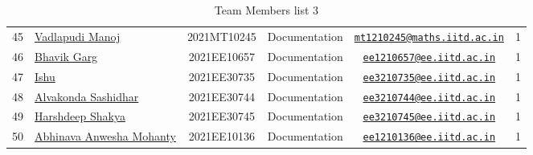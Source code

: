 \documentclass[table]{rapportCS}
\begin{document}
\begin{table}\label{sec:ourtribethree}
  \caption{Team Members list 3}
  \label{tab:team-members}
  
  \begin{tabular}{|p{.3cm}|p{3cm}|c|p{2.7cm}|c|c|}
  \hline
45 & \href{https://www.linkedin.com/in/vadlapudi-manoj-5a764825a/}{Vadlapudi Manoj} &
2021MT10245 & Documentation  &
\href{mailto:mt1210245@maths.iitd.ac.in}{\nolinkurl{mt1210245@maths.iitd.ac.in}}
& 1 \\
46 & \href{https://www.linkedin.com/in/bhavik-garg-4b214422a}{Bhavik
Garg} & 2021EE10657 & Documentation  &
\href{mailto:ee1210657@ee.iitd.ac.in}{\nolinkurl{ee1210657@ee.iitd.ac.in}}
& 1 \\
47 & \href{https://www.linkedin.com/in/ishu-ishu-9241242ab/}{Ishu} &
2021EE30735 & Documentation  &
\href{mailto:ee3210735@ee.iitd.ac.in}{\nolinkurl{ee3210735@ee.iitd.ac.in}}
& 1 \\
48 &
\href{https://www.linkedin.com/in/sashidhar-alvakonda-32b9011a5}{Alvakonda
Sashidhar} & 2021EE30744 & Documentation  &
\href{mailto:ee3210744@ee.iitd.ac.in}{\nolinkurl{ee3210744@ee.iitd.ac.in}}
& 1 \\
49 &
\href{https://www.linkedin.com/in/harshdeep-shakya-507304236/}{Harshdeep
Shakya} & 2021EE30745 & Documentation  &
\href{mailto:ee3210745@ee.iitd.ac.in}{\nolinkurl{ee3210745@ee.iitd.ac.in}}
& 1 \\
50 &
\href{https://www.linkedin.com/in/abhinava-a-mohanty-30a3a6232}{Abhinava
Anwesha Mohanty} & 2021EE10136 & Documentation  &
\href{mailto:ee1210136@ee.iitd.ac.in}{\nolinkurl{ee1210136@ee.iitd.ac.in}}
& 1 \\


\end{tabular}
\end{table}
\end{document}
